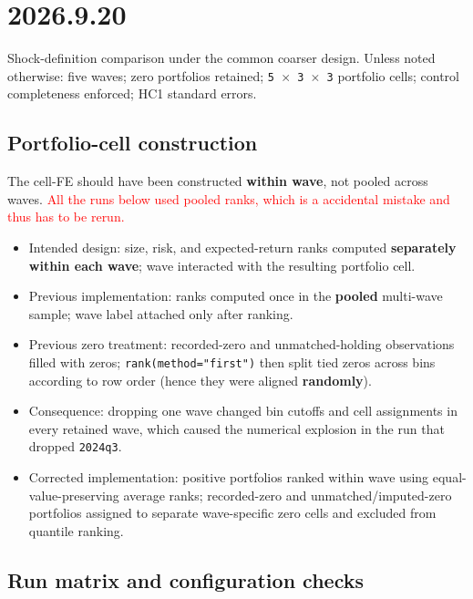 \documentclass[11pt,letterpaper,english,final]{article}
\begin{document}
\clearpage
\section{2026.9.20}
\setcounter{table}{0}

Shock-definition comparison under the common coarser design. Unless noted otherwise: five waves; zero portfolios retained; \texttt{5 $\times$ 3 $\times$ 3} portfolio cells; control completeness enforced; HC1 standard errors.

\subsection{Portfolio-cell construction}

\begin{framed}
\noindent The cell-FE should have been constructed \textbf{within wave}, not pooled across waves.  \textcolor{red}{All the runs below used pooled ranks, which is a accidental mistake and thus has to be rerun.}
\end{framed}

\begin{itemize}
\item Intended design: size, risk, and expected-return ranks computed \textbf{separately within each wave}; wave interacted with the resulting portfolio cell.

\item Previous implementation: ranks computed once in the \textbf{pooled} multi-wave sample; wave label attached only after ranking.

\item Previous zero treatment: recorded-zero and unmatched-holding observations filled with zeros; \texttt{rank(method="first")} then split tied zeros across bins according to row order (hence they were aligned \textbf{randomly}).

\item Consequence: dropping one wave changed bin cutoffs and cell assignments in every retained wave, which caused the numerical explosion in the run that dropped \texttt{2024q3}.

\item Corrected implementation: positive portfolios ranked within wave using equal-value-preserving average ranks; recorded-zero and unmatched/imputed-zero portfolios assigned to separate wave-specific zero cells and excluded from quantile ranking.
\end{itemize}

\subsection{Run matrix and configuration checks}
\end{document}

